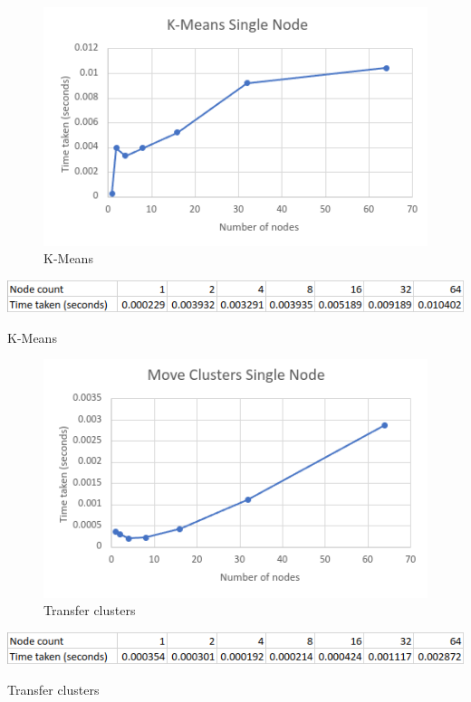 \documentclass{article}
\begin{document}
\clearpage
\begin{figure}[!htb]
\includegraphics[width=\textwidth]{single-node/k-means.png}
\caption{K-Means}
\label{fig:8}
\end{figure}
\begin{table}[!htb]
\includegraphics[width=\textwidth]{single-node/k-means-table.png}
\caption{K-Means}
\label{tab:8}
\end{table}

\clearpage
\begin{figure}[!htb]
\includegraphics[width=\textwidth]{single-node/move-clusters.png}
\caption{Transfer clusters}
\label{fig:9}
\end{figure}
\begin{table}[!htb]
\includegraphics[width=\textwidth]{single-node/move-clusters-table.png}
\caption{Transfer clusters}
\label{tab:9}
\end{table}
\end{document}
